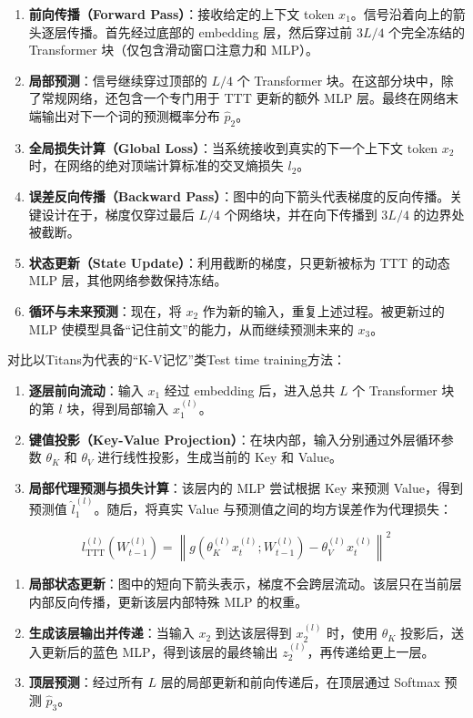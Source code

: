 \begin{enumerate}
\def\labelenumi{\arabic{enumi}.}
\tightlist
\item
  \textbf{前向传播（Forward Pass）}：接收给定的上下文 token \(x_1\)。信号沿着向上的箭头逐层传播。首先经过底部的 embedding 层，然后穿过前 \(3L/4\) 个完全冻结的 Transformer 块（仅包含滑动窗口注意力和 MLP）。
\item
  \textbf{局部预测}：信号继续穿过顶部的 \(L/4\) 个 Transformer 块。在这部分块中，除了常规网络，还包含一个专门用于 TTT 更新的额外 MLP 层。最终在网络末端输出对下一个词的预测概率分布 \(\hat p_2\)。
\item
  \textbf{全局损失计算（Global Loss）}：当系统接收到真实的下一个上下文 token \(x_2\) 时，在网络的绝对顶端计算标准的交叉熵损失 \(l_2\)。
\item
  \textbf{误差反向传播（Backward Pass）}：图中的向下箭头代表梯度的反向传播。关键设计在于，梯度仅穿过最后 \(L/4\) 个网络块，并在向下传播到 \(3L/4\) 的边界处被截断。
\item
  \textbf{状态更新（State Update）}：利用截断的梯度，只更新被标为 TTT 的动态 MLP 层，其他网络参数保持冻结。
\item
  \textbf{循环与未来预测}：现在，将 \(x_2\) 作为新的输入，重复上述过程。被更新过的 MLP 使模型具备``记住前文''的能力，从而继续预测未来的 \(x_3\)。
\end{enumerate}

对比以Titans为代表的``K-V记忆''类Test time training方法：

\begin{enumerate}
\def\labelenumi{\arabic{enumi}.}
\tightlist
\item
  \textbf{逐层前向流动}：输入 \(x_1\) 经过 embedding 后，进入总共 \(L\) 个 Transformer 块的第 \(l\) 块，得到局部输入 \(x_1^{(l)}\)。
\item
  \textbf{键值投影（Key-Value Projection）}：在块内部，输入分别通过外层循环参数 \(\theta_K\) 和 \(\theta_V\) 进行线性投影，生成当前的 Key 和 Value。
\item
  \textbf{局部代理预测与损失计算}：该层内的 MLP 尝试根据 Key 来预测 Value，得到预测值 \(\hat l_1^{(l)}\)。随后，将真实 Value 与预测值之间的均方误差作为代理损失：
\end{enumerate}

\[
l^{(l)}_{\mathrm{TTT}}\left(W^{(l)}_{t-1}\right)
=
\left\|g\!\left(\theta_K^{(l)}x_t^{(l)};W^{(l)}_{t-1}\right)
- \theta_V^{(l)}x_t^{(l)}
\right\|^2
\]

\begin{enumerate}
\def\labelenumi{\arabic{enumi}.}
\setcounter{enumi}{3}
\tightlist
\item
  \textbf{局部状态更新}：图中的短向下箭头表示，梯度不会跨层流动。该层只在当前层内部反向传播，更新该层内部特殊 MLP 的权重。
\item
  \textbf{生成该层输出并传递}：当输入 \(x_2\) 到达该层得到 \(x_2^{(l)}\) 时，使用 \(\theta_K\) 投影后，送入更新后的蓝色 MLP，得到该层的最终输出 \(z_2^{(l)}\)，再传递给更上一层。
\item
  \textbf{顶层预测}：经过所有 \(L\) 层的局部更新和前向传递后，在顶层通过 Softmax 预测 \(\hat p_3\)。
\end{enumerate}


